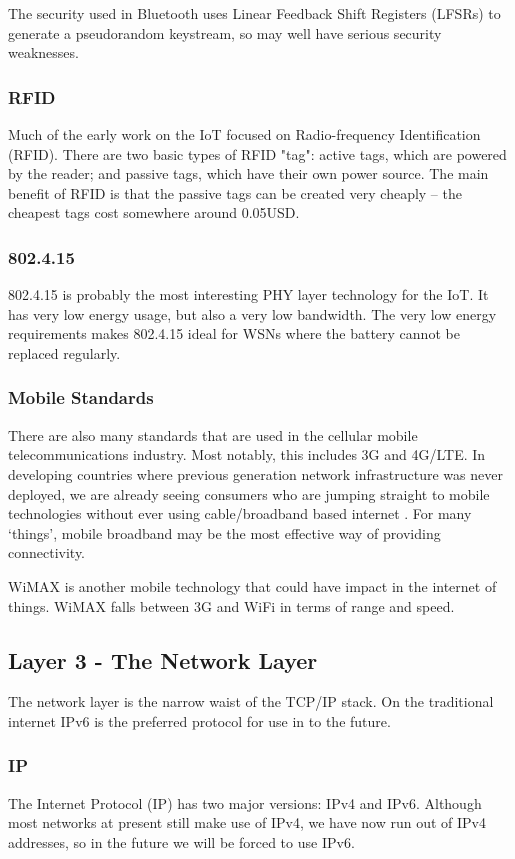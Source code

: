 \documentclass[12pt,journal,compsoc]{IEEEtran}
\begin{document}
The security used in Bluetooth uses Linear Feedback Shift Registers (LFSRs) to
generate a pseudorandom keystream, so may well have serious security
weaknesses.

\subsubsection{RFID}
Much of the early work on the IoT focused on Radio-frequency Identification
(RFID). There are two basic types of RFID "tag": active tags, which are powered
by the reader; and passive tags, which have their own power source. The main
benefit of RFID is that the passive tags can be created very cheaply -- the
cheapest tags cost somewhere around 0.05USD. 

\subsubsection{802.4.15}
802.4.15 is probably the most interesting PHY layer technology for the IoT. It has very
low energy usage, but also a very low bandwidth. The very low energy
requirements makes 802.4.15 ideal for WSNs where the battery cannot be replaced
regularly. 

\subsubsection{Mobile Standards}
There are also many standards that are used in the cellular mobile
telecommunications industry. Most notably, this includes 3G and 4G/LTE. In
developing countries where previous generation network infrastructure was never
deployed, we are already seeing consumers who are jumping straight to mobile
technologies without ever using cable/broadband based internet
\cite{Kritzinger2013}. For many `things', mobile broadband may be the most
effective way of providing connectivity.  

WiMAX is another mobile technology that could have impact in the internet of
things. WiMAX falls between 3G and WiFi in terms of range and speed.  

\subsection{Layer 3 - The Network Layer}
The network layer is the narrow waist of the TCP/IP stack. On the traditional
internet IPv6 is the preferred protocol for use in to the future.

\subsubsection{IP}
The Internet Protocol (IP) has two major versions: IPv4 and IPv6. Although most
networks at present still make use of IPv4, we have now run out of IPv4
addresses, so in the future we will be forced to use IPv6.
\end{document}
